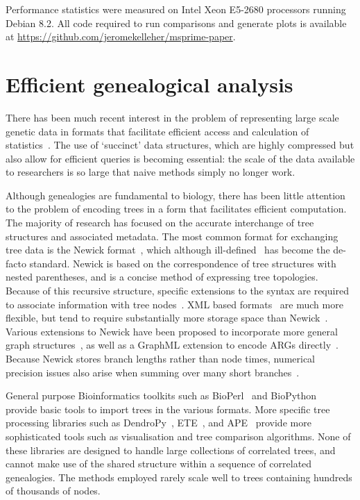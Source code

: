 \documentclass[10pt]{article}
\begin{document}
Performance statistics were measured on Intel Xeon E5-2680 processors
running Debian 8.2. All code required to run comparisons and
generate plots is available at
\url{https://github.com/jeromekelleher/msprime-paper}.

\section{Efficient genealogical analysis}
\label{sec-analysis}

There has been much recent interest in the problem of representing large scale
genetic data in formats that facilitate efficient access and calculation of
statistics~\citep{d14,lkkq15,l15}. The use of
`succinct' data structures, which are highly compressed but also allow for
efficient queries is becoming essential: the scale of the data available to
researchers is so large that naive methods simply no longer work.

Although genealogies are fundamental to biology, there has been little
attention to the problem of encoding trees in a form that facilitates efficient
computation. The majority of research has focused on the accurate interchange
of tree structures and associated metadata.  The most common format for
exchanging tree data is the Newick format~\citep{f89}, which although
ill-defined~\citep{vbch12} has become the de-facto standard. Newick is based on
the correspondence of tree structures with nested parentheses, and is a concise
method of expressing tree topologies.  Because of this recursive structure,
specific extensions to the syntax are required to associate information with
tree nodes~\citep{msm97,ze01}. XML based formats~\citep{hz09,vbch12} are much
more flexible, but tend to require substantially more storage space than
Newick~\citep{vbch12}.  Various extensions to Newick have been proposed to
incorporate more general graph structures~\citep{mm06,bn06,crv08,trn08},
as well as a GraphML extension to encode ARGs directly~\citep{mwk13}.
Because Newick stores branch lengths rather than node times, numerical
precision issues also arise when summing over many short branches~\citep{mwk13}.

General purpose Bioinformatics toolkits such as BioPerl~\citep{sbbb10} and
BioPython~\citep{cacc09} provide basic tools to import trees in the various
formats. More specific tree processing libraries such as DendroPy~\citep{sh10},
ETE~\citep{hdg10}, and APE~\citep{pcs04} provide more sophisticated tools such
as visualisation and tree comparison algorithms. None of these libraries are
designed to handle large collections of correlated trees, and cannot make use
of the shared structure within a sequence of correlated genealogies. The
methods employed rarely scale well to trees containing hundreds of thousands of
nodes.
\end{document}
